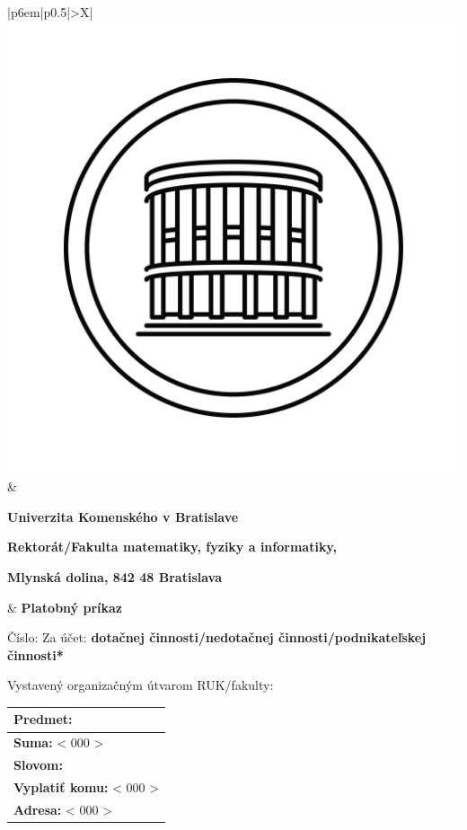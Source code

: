 \documentclass[10pt,a4paper]{article}
\newcommand{\placeholder}[1]{< #1 >}
\newcommand{\amount}{\placeholder{000}}
\newcommand{\grantee}{\placeholder{000}}
\newcommand{\address}{\placeholder{000}}
\begin{document}
\begin{table}[h]
\centering
\begin{tabularx}{\linewidth}{|p{6em}|p{0.5\linewidth}|>{\centering\arraybackslash}X|}
	\hline
	\includegraphics[width=\linewidth]{images/uk_logo_square} & {
		\vspace*{-5em}
		\textbf{Univerzita Komenského v Bratislave}
		
		\textbf{Rektorát/Fakulta matematiky, fyziky a informatiky,}
		
		\textbf{Mlynská dolina, 842 48 Bratislava}
	} & \vspace*{-3.5em}\textbf{Platobný príkaz} \\ \hline
\end{tabularx}
\end{table}

Číslo: \hspace*{0.27\linewidth} Za účet: \textbf{dotačnej činnosti/nedotačnej činnosti/podnikateľskej činnosti*}

Vystavený organizačným útvarom RUK/fakulty:

\bgroup
\def\arraystretch{2}
\begin{table}[h]
\centering
\begin{tabularx}{\linewidth}{|X|}
	\hline
	\textbf{Predmet:} \\ \hline
	\textbf{Suma:} \amount \\
	\textbf{Slovom:} \\ \hline
	\textbf{Vyplatiť komu:} \grantee \\
	\textbf{Adresa:} \address \\ \hline
\end{tabularx}
\end{table}
\egroup
\end{document}
